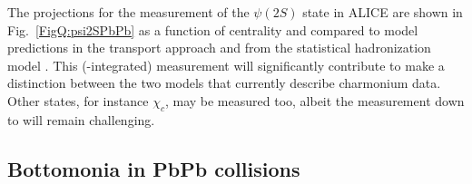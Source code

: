 \documentclass[../report.tex]{subfiles}
\providecommand{\main}{..}
\begin{document}
The projections for the measurement of the $\psi(2S)$ state in ALICE are shown in Fig.~\ref{FigQ:psi2SPbPb} as a function of centrality and compared to model predictions in the transport approach \cite{Du:2015wha}  and from the statistical hadronization model \cite{Andronic:2017pug}. This (\pT-integrated) measurement will significantly contribute to make a distinction between the two models that currently describe charmonium data.
Other states, for instance $\chi_c$, may be measured too, albeit the measurement down to  will remain challenging.



\clearpage

\subsection{Bottomonia in PbPb collisions}%

\end{document}
